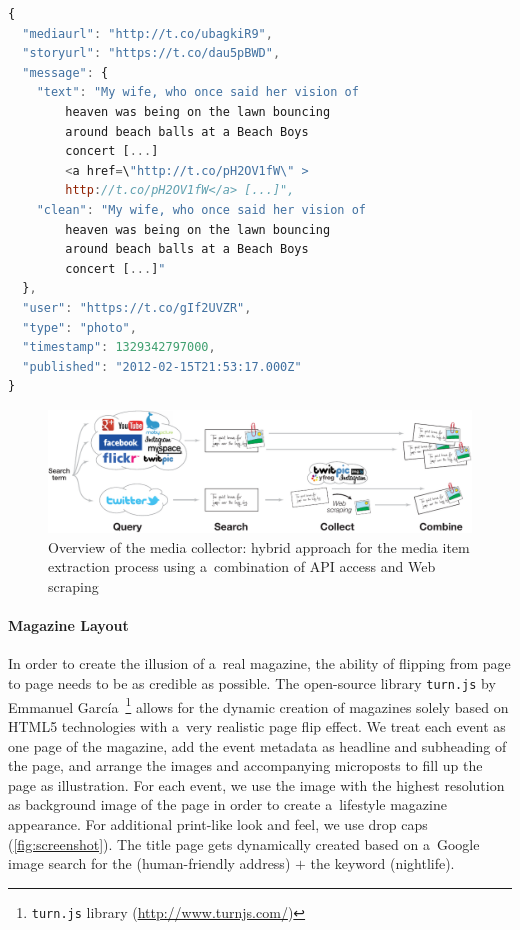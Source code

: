 \documentclass[runningheads,a4paper]{llncs}
\newcommand{\googleplus}{Google\nolinebreak\hspace{0em}\raisebox{.28ex}{\tiny\bf +}\kern-0.2ex\xspace}
\begin{document}
{%
\begin{lstlisting}[language=JavaScript,caption={Sample output of the media collector showing a~Google+ post (edited for legibility, URLs shortened).},label={lst:media}]
{
  "mediaurl": "http://t.co/ubagkiR9",
  "storyurl": "https://t.co/dau5pBWD",
  "message": {
    "text": "My wife, who once said her vision of
        heaven was being on the lawn bouncing
        around beach balls at a Beach Boys
        concert [...]
        <a href=\"http://t.co/pH2OV1fW\" >
        http://t.co/pH2OV1fW</a> [...]",
    "clean": "My wife, who once said her vision of
        heaven was being on the lawn bouncing
        around beach balls at a Beach Boys
        concert [...]"
  },
  "user": "https://t.co/gIf2UVZR",
  "type": "photo",
  "timestamp": 1329342797000,
  "published": "2012-02-15T21:53:17.000Z"
}
\end{lstlisting}

\begin{figure}[htb!]
\centering
\includegraphics[width=0.8\linewidth]{./architecture.pdf}
\caption{Overview of the media collector: hybrid approach for the media item extraction process using a~combination of API access and Web scraping}
\label{fig:architecture}
\end{figure}

\paragraph{Magazine Layout}
In order to create the illusion of a~real magazine, the ability of flipping from page to page needs to be as credible as possible. The open-source library \texttt{turn.js} by Emmanuel García~\footnote{\texttt{turn.js} library (\url{http://www.turnjs.com/})} allows for the dynamic creation of magazines solely based on HTML5 technologies with a~very realistic page flip effect. We treat each event as one page of the magazine, add the event metadata as headline and subheading of the page, and arrange the images and accompanying microposts to fill up the page as illustration. For each event, we use the image with the highest resolution as background image of the page in order to create a~lifestyle magazine appearance. For additional print-like look and feel, we use drop caps (\autoref{fig:screenshot}). The title page gets dynamically created based on a~Google image search for the (human-friendly address) $+$ the keyword (nightlife).

}
\end{document}
